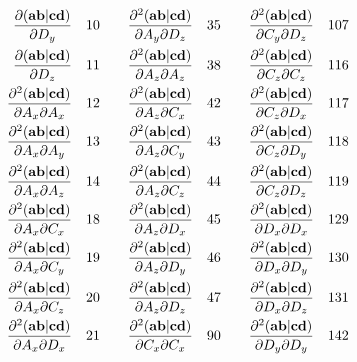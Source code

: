\documentclass[12pt]{article}
\begin{document}
\begin{scriptsize}
\begin{eqnarray}
\frac{\partial ({\bf ab}|{\bf cd})}{\partial D_y} \quad 10 \quad \quad \frac{\partial^2 ({\bf ab}|{\bf cd})}{\partial A_y \partial D_z} \quad 35 \quad \quad 
\frac{\partial^2 ({\bf ab}|{\bf cd})}{\partial C_y \partial D_z} \quad 107 \nonumber \\
\frac{\partial ({\bf ab}|{\bf cd})}{\partial D_z} \quad 11 \quad \quad \frac{\partial^2 ({\bf ab}|{\bf cd})}{\partial A_z \partial A_z} \quad 38 \quad \quad 
\frac{\partial^2 ({\bf ab}|{\bf cd})}{\partial C_z \partial C_z} \quad 116 \nonumber \\
\frac{\partial^2 ({\bf ab}|{\bf cd})}{\partial A_x \partial A_x} \quad 12 \quad \quad \frac{\partial^2 ({\bf ab}|{\bf cd})}{\partial A_z \partial C_x} \quad 42 \quad \quad 
\frac{\partial^2 ({\bf ab}|{\bf cd})}{\partial C_z \partial D_x} \quad 117 \nonumber \\
\frac{\partial^2 ({\bf ab}|{\bf cd})}{\partial A_x \partial A_y} \quad 13 \quad \quad \frac{\partial^2 ({\bf ab}|{\bf cd})}{\partial A_z \partial C_y} \quad 43 \quad \quad 
\frac{\partial^2 ({\bf ab}|{\bf cd})}{\partial C_z \partial D_y} \quad 118 \nonumber \\
\frac{\partial^2 ({\bf ab}|{\bf cd})}{\partial A_x \partial A_z} \quad 14 \quad \quad \frac{\partial^2 ({\bf ab}|{\bf cd})}{\partial A_z \partial C_z} \quad 44 \quad \quad 
\frac{\partial^2 ({\bf ab}|{\bf cd})}{\partial C_z \partial D_z} \quad 119 \nonumber \\
\frac{\partial^2 ({\bf ab}|{\bf cd})}{\partial A_x \partial C_x} \quad 18 \quad \quad \frac{\partial^2 ({\bf ab}|{\bf cd})}{\partial A_z \partial D_x} \quad 45 \quad \quad 
\frac{\partial^2 ({\bf ab}|{\bf cd})}{\partial D_x \partial D_x} \quad 129 \nonumber \\
\frac{\partial^2 ({\bf ab}|{\bf cd})}{\partial A_x \partial C_y} \quad 19 \quad \quad \frac{\partial^2 ({\bf ab}|{\bf cd})}{\partial A_z \partial D_y} \quad 46 \quad \quad 
\frac{\partial^2 ({\bf ab}|{\bf cd})}{\partial D_x \partial D_y} \quad 130 \nonumber \\
\frac{\partial^2 ({\bf ab}|{\bf cd})}{\partial A_x \partial C_z} \quad 20 \quad \quad \frac{\partial^2 ({\bf ab}|{\bf cd})}{\partial A_z \partial D_z} \quad 47 \quad \quad 
\frac{\partial^2 ({\bf ab}|{\bf cd})}{\partial D_x \partial D_z} \quad 131 \nonumber \\
\frac{\partial^2 ({\bf ab}|{\bf cd})}{\partial A_x \partial D_x} \quad 21 \quad \quad \frac{\partial^2 ({\bf ab}|{\bf cd})}{\partial C_x \partial C_x} \quad 90 \quad \quad 
\frac{\partial^2 ({\bf ab}|{\bf cd})}{\partial D_y \partial D_y} \quad 142 \nonumber \\

\end{eqnarray}
\end{scriptsize}
\end{document}
